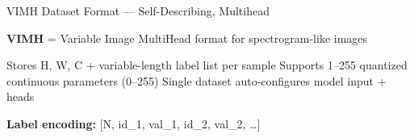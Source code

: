 \begin{slide}[\slideopts,toc={VIMH Format}]{VIMH Dataset Format --- Self-Describing, Multihead}
  \vspace{-0.75em}
  \begin{itemize}
    \mpitem \textbf{VIMH} = Variable Image MultiHead format for spectrogram-like images
    \vspace{-0.25em}
    \begin{itemize}
      \mpitem Stores H, W, C + variable-length label list per sample
      \mpitem Supports 1--255 quantized continuous parameters (0--255)
      \mpitem Single dataset auto-configures model input + heads
    \end{itemize}
    \vspace{0.25em}
    \mpitem \textbf{Label encoding:} [N, id\_1, val\_1, id\_2, val\_2, \dots]
  \end{itemize}
  \vspace{-0.5em}
  \begin{center}

\end{center}
\end{slide}
